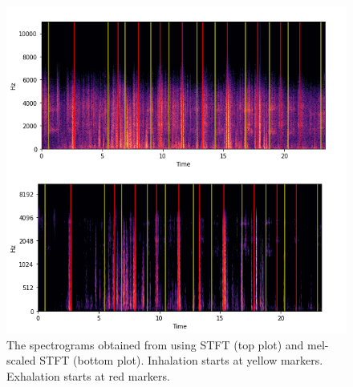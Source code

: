 \begin{figure}[h]
    \centerline{\includegraphics[scale=0.62]{figures/stft_mel-stft.png}}
    \caption{The spectrograms obtained from using STFT (top plot) and mel-scaled STFT (bottom plot). Inhalation starts at yellow markers. Exhalation starts at red markers.}
    \label{fig:stft_mel-stft}
\end{figure}

